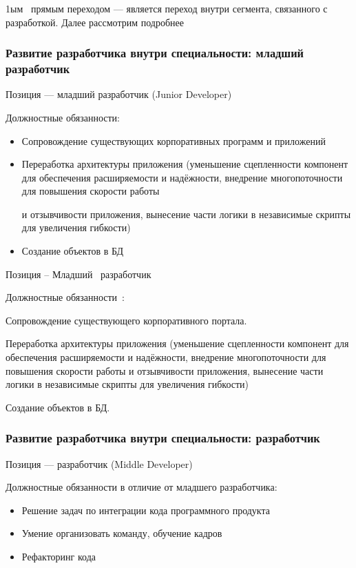 \documentclass{../industrial-development}
\begin{document}
\lecturenotes
 
1ым~\cite{mc} прямым переходом --- является переход внутри сегмента, связанного с разработкой. Далее рассмотрим подробнее

\begin{frame} \frametitle{Развитие разработчика внутри специальности: младший разработчик}
 \begin{block}{}
  \alert{Позиция --- младший разработчик (Junior Developer)}

Должностные обязанности: 
  \end{block}
  \begin{itemize}
  \item Сопровождение существующих корпоративных программ и приложений
  \item Переработка архитектуры приложения (уменьшение сцепленности компонент для обеспечения расширяемости и надёжности, внедрение многопоточности для повышения скорости работы 

и отзывчивости приложения, вынесение части логики в независимые скрипты для увеличения гибкости)
  \item Создание объектов в БД
  \end{itemize}
\end{frame}

\lecturenotes

Позиция – Младший~\cite{itcf} разработчик~\cite{hh}

Должностные обязанности~\cite{rab}:

Сопровождение существующего корпоративного портала.

Переработка архитектуры приложения (уменьшение сцепленности компонент для обеспечения расширяемости и надёжности, внедрение многопоточности для повышения скорости работы и отзывчивости приложения, вынесение части логики в независимые скрипты для увеличения гибкости)

 
Создание объектов в БД.


\begin{frame} \frametitle{Развитие разработчика внутри специальности: разработчик}
 \begin{block}{}
  \alert{Позиция --- разработчик (Middle Developer)}

Должностные обязанности в отличие от младшего разработчика: 
  \end{block}
  \begin{itemize}
  \item Решение задач по интеграции кода программного продукта
  \item Умение организовать  команду, обучение кадров
  \item Рефакторинг кода
  \end{itemize}
\end{frame}
\end{document}
